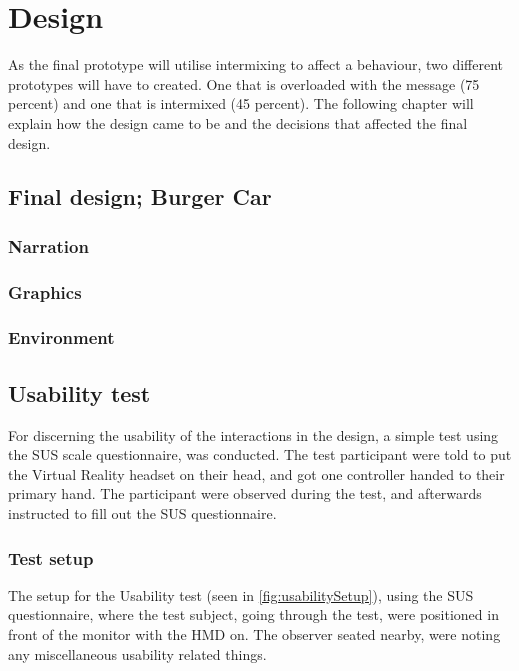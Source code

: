 \chapter{Design}

As the final prototype will utilise intermixing to affect a behaviour, two different prototypes will have to created. One that is overloaded with the message (75 percent) and one that is intermixed (45 percent). The following chapter will explain how the design came to be and the decisions that affected the final design.

\section{Final design; Burger Car}

\subsection{Narration}

\subsection{Graphics}

\subsection{Environment}

\section{Usability test}
    For discerning the usability of the interactions in the design, a simple test using the SUS scale questionnaire, was conducted. The test participant were told to put the Virtual Reality headset on their head, and got one controller handed to their primary hand. The participant were observed during the test, and afterwards instructed to fill out the SUS questionnaire.
    
\subsection{Test setup}
    The setup for the Usability test (seen in \autoref{fig:usabilitySetup}), using the SUS questionnaire, where the test subject, going through the test, were positioned in front of the monitor with the HMD on. The observer seated nearby, were noting any miscellaneous usability related things.
    
